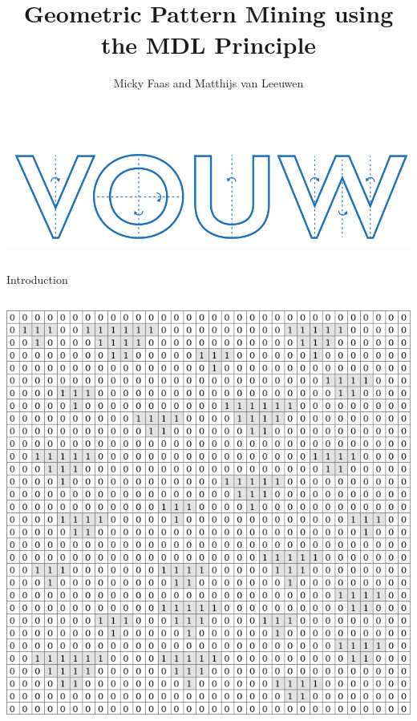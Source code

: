 \documentclass[11pt]{beamer}
\author{Micky Faas and Matthijs van Leeuwen}
\title{Geometric Pattern Mining using the MDL Principle}
\institute{LIACS, Leiden University, Leiden, the Netherlands}
\begin{document}
\beamertemplatenavigationsymbolsempty
\begin{frame}
\nointerlineskip%
\begin{columns}
\column{\dimexpr\paperwidth}
\centering %



\includegraphics[width=0.4\paperwidth]{"VOUW logo-02"} 
\maketitle
\end{columns}
\end{frame}

\begin{frame}{Introduction}
\nointerlineskip%
\begin{columns}
\column{\dimexpr\paperwidth}
\centering
\includegraphics[scale=.3]{"triangles"} 
\end{columns}
\end{frame}
\end{document}
